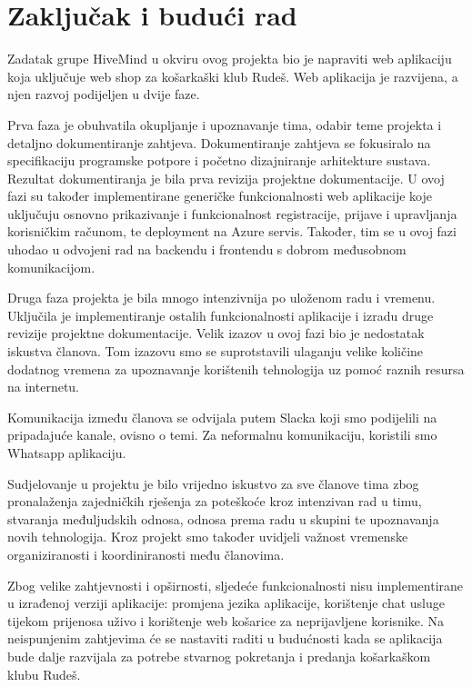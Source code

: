 \chapter{Zaključak i budući rad}
		
		 \textnormal{Zadatak grupe HiveMind u okviru ovog projekta bio je napraviti web aplikaciju koja uključuje web shop za košarkaški klub Rudeš. Web aplikacija je razvijena, a njen razvoj podijeljen u dvije faze.}

		\textnormal{Prva faza je obuhvatila okupljanje i upoznavanje tima, odabir teme projekta i detaljno dokumentiranje zahtjeva. Dokumentiranje zahtjeva se fokusiralo na specifikaciju programske potpore i početno dizajniranje arhitekture sustava. Rezultat dokumentiranja je bila prva revizija projektne dokumentacije. U ovoj fazi su također implementirane generičke funkcionalnosti web aplikacije koje uključuju osnovno prikazivanje i funkcionalnost registracije, prijave i upravljanja korisničkim računom, te deployment na Azure servis. Također, tim se u ovoj fazi uhodao u odvojeni rad na backendu i frontendu s dobrom međusobnom komunikacijom.}

		\textnormal{Druga faza projekta je bila mnogo intenzivnija po uloženom radu i vremenu. Uključila je implementiranje ostalih funkcionalnosti aplikacije i izradu druge revizije projektne dokumentacije. Velik izazov u ovoj fazi bio je nedostatak iskustva članova. Tom izazovu smo se suprotstavili ulaganju velike količine dodatnog vremena za upoznavanje korištenih tehnologija uz pomoć raznih resursa na internetu.}

		\textnormal{Komunikacija između članova se odvijala putem Slacka koji smo podijelili na pripadajuće kanale, ovisno o temi. Za neformalnu komunikaciju, koristili smo Whatsapp aplikaciju.}

		\textnormal{Sudjelovanje u projektu je bilo vrijedno iskustvo za sve članove tima zbog pronalaženja zajedničkih rješenja za poteškoće kroz intenzivan rad u timu, stvaranja međuljudskih odnosa, odnosa prema radu u skupini te upoznavanja novih tehnologija. Kroz projekt smo također uvidjeli važnost vremenske organiziranosti i koordiniranosti među članovima.}

		\textnormal{Zbog velike zahtjevnosti i opširnosti, sljedeće funkcionalnosti nisu implementirane u izrađenoj verziji aplikacije: promjena jezika aplikacije, korištenje chat usluge tijekom prijenosa uživo i korištenje web košarice za neprijavljene korisnike. Na neispunjenim zahtjevima će se nastaviti raditi u budućnosti kada se aplikacija bude dalje razvijala za potrebe stvarnog pokretanja i predanja košarkaškom klubu Rudeš.}

		\eject 